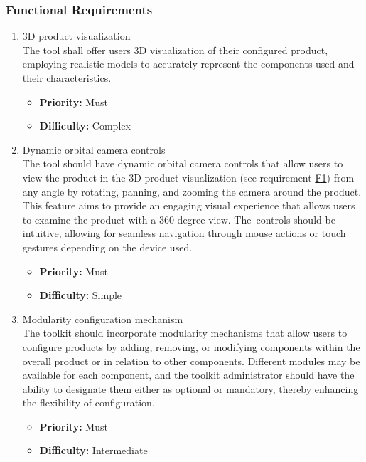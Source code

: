 \subsubsection{Functional Requirements}

\begin{enumerate}[label=\textbf{F\arabic*:}, leftmargin=30pt]
\item \label{itm:F1} 3D product visualization
\vspace{2pt}
\\The tool shall offer users 3D visualization of their configured product, employing realistic models to accurately represent the components used and their characteristics.
\begin{itemize}[noitemsep, label=\trianglebullet]
    \item \textbf{Priority:} Must
    \item \textbf{Difficulty:} Complex
\end{itemize}
\vspace{4pt}

\item \label{itm:F2} Dynamic orbital camera controls
\vspace{2pt}
\\The tool should have dynamic orbital camera controls that allow users to view the product in the 3D product visualization (see requirement \hyperref[itm:F1]{F1}) from any angle by rotating, panning, and zooming the camera around the product. This feature aims to provide an engaging visual experience that allows users to examine the product with a 360-degree view. The~controls should be intuitive, allowing for seamless navigation through mouse actions or touch gestures depending on the device used.
\begin{itemize}[noitemsep, label=\trianglebullet]
    \item \textbf{Priority:} Must
    \item \textbf{Difficulty:} Simple
\end{itemize}
\vspace{4pt}

\item \label{itm:F3} Modularity configuration mechanism
\vspace{2pt}
\\The toolkit should incorporate modularity mechanisms that allow users to configure products by adding, removing, or modifying components within the overall product or in relation to other components. Different modules may be available for each component, and the toolkit administrator should have the ability to designate them either as optional or mandatory, \phantom{thereby enhancing the flexibility of configuration.}\newpage thereby enhancing the flexibility of configuration.
\begin{itemize}[noitemsep, label=\trianglebullet]
    \item \textbf{Priority:} Must
    \item \textbf{Difficulty:} Intermediate
\end{itemize}
\vspace{4pt}


\end{enumerate}
